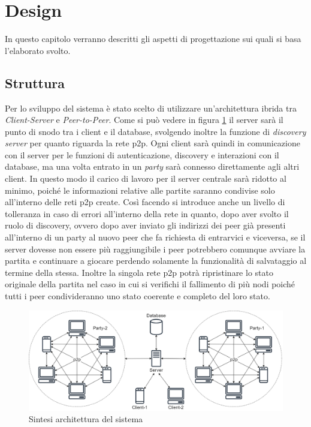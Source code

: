 \section{Design}
In questo capitolo verranno descritti gli aspetti di progettazione sui quali si basa l'elaborato svolto.

\subsection{Struttura}

Per lo sviluppo del sistema è stato scelto di utilizzare un'architettura ibrida tra \emph{Client-Server} e \emph{Peer-to-Peer}. Come si può vedere in figura \ref{fig:architettura} il server sarà il punto di snodo tra i client e il database, svolgendo inoltre la funzione di \emph{discovery server} per quanto riguarda la rete p2p. Ogni client sarà quindi in comunicazione con il server per le funzioni di autenticazione, discovery e interazioni con il database, ma una volta entrato in un \emph{party} sarà connesso direttamente agli altri client. In questo modo il carico di lavoro per il server centrale sarà ridotto al minimo, poiché le informazioni relative alle partite saranno condivise solo all'interno delle reti p2p create. Così facendo si introduce anche un livello di tolleranza in caso di errori all'interno della rete in quanto, dopo aver svolto il ruolo di discovery, ovvero dopo aver inviato gli indirizzi dei peer già presenti all'interno di un party al nuovo peer che fa richiesta di entrarvici e viceversa, se il server dovesse non essere più raggiungibile i peer potrebbero comunque avviare la partita e continuare a giocare perdendo solamente la funzionalità di salvataggio al termine della stessa. Inoltre la singola rete p2p potrà ripristinare lo stato originale della partita nel caso in cui si verifichi il fallimento di più nodi poiché tutti i peer condivideranno uno stato coerente e completo del loro stato.

\begin{figure}[H]
\centering
\includegraphics[width=\textwidth]{img/draw/architettura.png}
\caption{Sintesi architettura del sistema}
\label{fig:architettura}
\end{figure}

